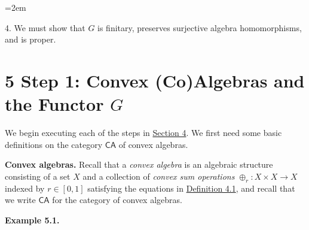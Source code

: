 \begin{list}{}{\leftmargin=2em}
\hypertarget{html:S4.I1.i4}{}
\item[]  4. %
\hypertarget{html:S4.I1.i4.p1}{} We must show that %
\hypertarget{html:S4.I1.i4.p1.m1}{}\({G}\) is finitary, preserves surjective algebra homomorphisms, and is proper.
\par\medskip
  
 
\end{list}
   
%
\hypertarget{html:S5}{} %
\hypertarget{html:S5.m1}{}\section*{5 Step 1: Convex (Co)Algebras and the Functor \({G}\)}
\hypertarget{html:S5.p1}{} We begin executing each of the steps in \hyperlink{html:S4}{Section 4}. We first need some basic definitions on the category %
\hypertarget{html:S5.p1.m1}{}\({\mathsf{CA}}\) of convex algebras.
\par\medskip
\hypertarget{html:S5.SS0.SSS0.P0.SPx1}{} \par\noindent\textbf{Convex algebras.}\quad  %
\hypertarget{html:S5.SS0.SSS0.P0.SPx1.p1}{} Recall that a \emph{convex algebra} is an algebraic structure consisting of a set %
\hypertarget{html:S5.SS0.SSS0.P0.SPx1.p1.m1}{}\({X}\) and a collection of \emph{convex sum operations} %
\hypertarget{html:S5.SS0.SSS0.P0.SPx1.p1.m2}{}\({\oplus_{r}\colon X\times X\to X}\) indexed by %
\hypertarget{html:S5.SS0.SSS0.P0.SPx1.p1.m3}{}\({r\in[0,1]}\) satisfying the equations in \hyperlink{html:S4.Thmtheorem1}{Definition 4.1}, and recall that we write %
\hypertarget{html:S5.SS0.SSS0.P0.SPx1.p1.m4}{}\({\mathsf{CA}}\) for the category of convex algebras.
\par\medskip
\hypertarget{html:S5.Thmtheorem1}{} \par\noindent\textbf{\textbf{Example 5.1}\textbf{.}}\quad  %
